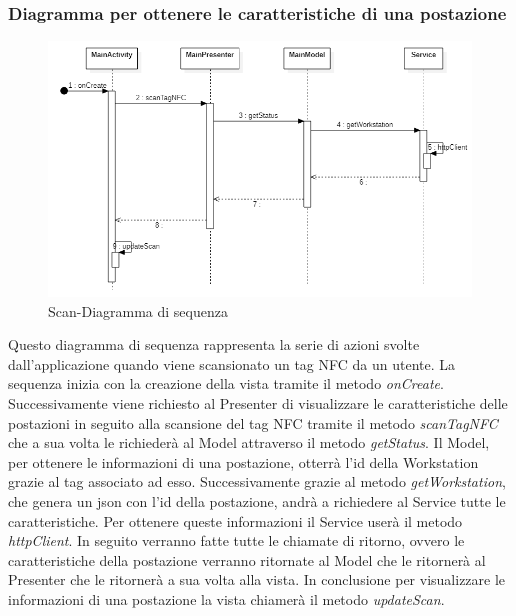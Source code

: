 \subsubsection{Diagramma per ottenere le caratteristiche di una postazione}
\begin{figure}[H]
	\centering
	\includegraphics[width=16cm]{res/images/apputenti-mainScanSeq.png}
	\caption{Scan-Diagramma di sequenza}
	\label{fig:Scan-Diagramma di sequenza}
\end{figure}
Questo diagramma di sequenza rappresenta la serie di azioni svolte dall'applicazione quando viene scansionato un tag NFC da un utente.
La sequenza inizia con la creazione della vista tramite il metodo \textit{onCreate}.
Successivamente viene richiesto al Presenter di visualizzare le caratteristiche delle postazioni in seguito alla scansione del tag NFC tramite il metodo \textit{scanTagNFC} che a sua volta le richiederà al Model attraverso il metodo \textit{getStatus}.
Il Model, per ottenere le informazioni di una postazione, otterrà l'id della Workstation grazie al tag associato ad esso.
Successivamente grazie al metodo \textit{getWorkstation}, che genera un json con l'id della postazione, andrà a richiedere al Service tutte le caratteristiche. Per ottenere queste informazioni il Service userà il metodo \textit{httpClient}.
In seguito verranno fatte tutte le chiamate di ritorno, ovvero le caratteristiche della postazione verranno ritornate al Model che le ritornerà
al Presenter che le ritornerà a sua volta alla vista.
In conclusione per visualizzare le informazioni di una postazione la vista chiamerà il metodo \textit{updateScan}.


